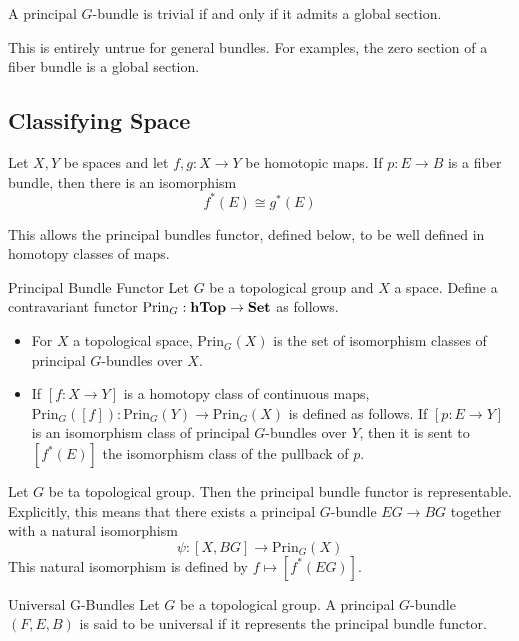 \documentclass[a4paper]{article}
\begin{document}
\begin{thm}{}{} A principal $G$-bundle is trivial if and only if it admits a global section. 
\end{thm}

This is entirely untrue for general bundles. For examples, the zero section of a fiber bundle is a global section. 

\subsection{Classifying Space}
\begin{thm}{}{} Let $X,Y$ be spaces and let $f,g:X\to Y$ be homotopic maps. If $p:E\to B$ is a fiber bundle, then there is an isomorphism $$f^\ast(E)\cong g^\ast(E)$$
\end{thm}

This allows the principal bundles functor, defined below, to be well defined in homotopy classes of maps. 

\begin{defn}{Principal Bundle Functor}{} Let $G$ be a topological group and $X$ a space. Define a contravariant functor $\text{Prin}_G:\bold{hTop}\to\bold{Set}$ as follows. 
\begin{itemize}
\item For $X$ a topological space, $\text{Prin}_G(X)$ is the set of isomorphism classes of principal $G$-bundles over $X$. 
\item If $[f:X\to Y]$ is a homotopy class of continuous maps, $\text{Prin}_G([f]):\text{Prin}_G(Y)\to\text{Prin}_G(X)$ is defined as follows. If $[p:E\to Y]$ is an isomorphism class of principal $G$-bundles over $Y$, then it is sent to $[f^\ast(E)]$ the isomorphism class of the pullback of $p$. 
\end{itemize}
\end{defn}

\begin{thm}{}{} Let $G$ be ta topological group. Then the principal bundle functor is representable. Explicitly, this means that there exists a principal $G$-bundle $EG\to BG$ together with a natural isomorphism $$\psi:[X,BG]\to\text{Prin}_G(X)$$ This natural isomorphism is defined by $f\mapsto[f^\ast(EG)]$. 
\end{thm}

\begin{defn}{Universal G-Bundles}{} Let $G$ be a topological group. A principal $G$-bundle $(F,E,B)$ is said to be universal if it represents the principal bundle functor. 
\end{defn}
\end{document}
